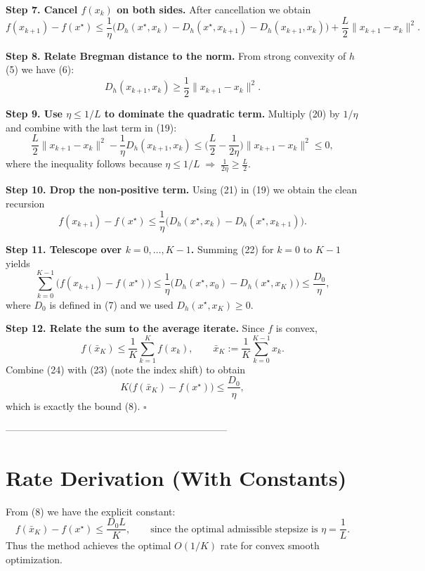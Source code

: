 \documentclass{article}
\newcommand{\Breg}[2]{D_{h}(#1,#2)}
\begin{document}
\noindent\textbf{Step 7. Cancel $f(x_{k})$ on both sides.}  
After cancellation we obtain
\[
f(x_{k+1})-f(x^{\star})
\le \frac{1}{\eta}\Big(\Breg{x^{\star}}{x_{k}}-\Breg{x^{\star}}{x_{k+1}}-\Breg{x_{k+1}}{x_{k}}\Big)
+\frac{L}{2}\|x_{k+1}-x_{k}\|^{2}.
\tag{19}
\]

\noindent\textbf{Step 8. Relate Bregman distance to the norm.}  
From strong convexity of $h$ (5) we have (6):
\[
\Breg{x_{k+1}}{x_{k}}\ge \frac12\|x_{k+1}-x_{k}\|^{2}.
\tag{20}
\]

\noindent\textbf{Step 9. Use $\eta\le 1/L$ to dominate the quadratic term.}  
Multiply (20) by $1/\eta$ and combine with the last term in (19):
\[
\frac{L}{2}\|x_{k+1}-x_{k}\|^{2}
-\frac{1}{\eta}\Breg{x_{k+1}}{x_{k}}
\le
\Big(\frac{L}{2}-\frac{1}{2\eta}\Big)\|x_{k+1}-x_{k}\|^{2}
\le 0,
\tag{21}
\]
where the inequality follows because $\eta\le 1/L\;\Rightarrow\; \frac{1}{2\eta}\ge \frac{L}{2}$.

\noindent\textbf{Step 10. Drop the non‑positive term.}  
Using (21) in (19) we obtain the clean recursion
\[
f(x_{k+1})-f(x^{\star})
\le \frac{1}{\eta}\Big(\Breg{x^{\star}}{x_{k}}-\Breg{x^{\star}}{x_{k+1}}\Big).
\tag{22}
\]

\noindent\textbf{Step 11. Telescope over $k=0,\dots,K-1$.}  
Summing (22) for $k=0$ to $K-1$ yields
\[
\sum_{k=0}^{K-1}\bigl(f(x_{k+1})-f(x^{\star})\bigr)
\le \frac{1}{\eta}\Big(\Breg{x^{\star}}{x_{0}}-\Breg{x^{\star}}{x_{K}}\Big)
\le \frac{D_{0}}{\eta},
\tag{23}
\]
where $D_{0}$ is defined in (7) and we used $\Breg{x^{\star}}{x_{K}}\ge 0$.

\noindent\textbf{Step 12. Relate the sum to the average iterate.}  
Since $f$ is convex,
\[
f(\bar{x}_{K}) \le \frac{1}{K}\sum_{k=1}^{K} f(x_{k}),
\qquad
\bar{x}_{K}:=\frac{1}{K}\sum_{k=0}^{K-1}x_{k}.
\tag{24}
\]
Combine (24) with (23) (note the index shift) to obtain
\[
K\bigl(f(\bar{x}_{K})-f(x^{\star})\bigr)
\le \frac{D_{0}}{\eta},
\]
which is exactly the bound (8). \hfill $\square$

--------------------------------------------------------------------

\section*{Rate Derivation (With Constants)}
From (8) we have the explicit constant:
\[
f(\bar{x}_{K})-f(x^{\star})\le \frac{D_{0}L}{K},
\qquad\text{since the optimal admissible stepsize is }\eta=\frac{1}{L}.
\tag{25}
\]
Thus the method achieves the optimal $O(1/K)$ rate for convex smooth optimization.
\end{document}
